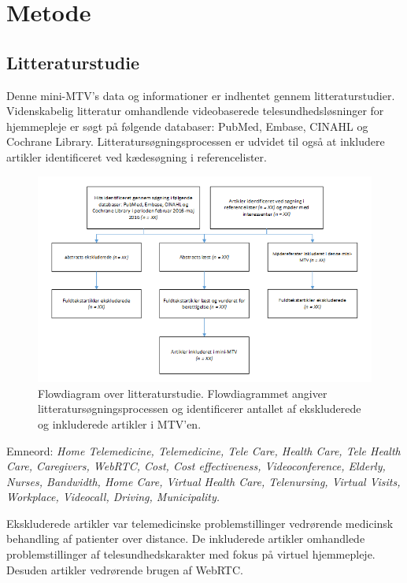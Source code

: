 \chapter{Metode}\label{chap:metode}

\section{Litteraturstudie}
Denne mini-MTV's data og informationer er indhentet gennem litteraturstudier. Videnskabelig litteratur omhandlende videobaserede telesundhedsløsninger for hjemmepleje er søgt på følgende databaser: PubMed, Embase, CINAHL og Cochrane Library. Litteratursøgningsprocessen er udvidet til også at inkludere artikler identificeret ved kædesøgning i referencelister.

\begin{figure}[H]
\centering
\includegraphics[width=1\textwidth]{Figurer/metode_flow.png}
\caption{\label{fig:metodeflow}Flowdiagram over  litteraturstudie. Flowdiagrammet angiver litteratursøgningsprocessen og identificerer antallet af ekskluderede og inkluderede artikler i MTV'en.}
\end{figure}

Emneord: \textit{Home Telemedicine, Telemedicine, Tele Care, Health Care, Tele Health Care, Caregivers, WebRTC, Cost, Cost effectiveness, Videoconference, Elderly, Nurses, Bandwidth, Home Care, Virtual Health Care, Telenursing, Virtual Visits, Workplace, Videocall, Driving, Municipality.}

Ekskluderede artikler var telemedicinske problemstillinger vedrørende medicinsk behandling af patienter over distance. De inkluderede artikler omhandlede problemstillinger af telesundhedskarakter med fokus på virtuel hjemmepleje. Desuden artikler vedrørende brugen af WebRTC.  

